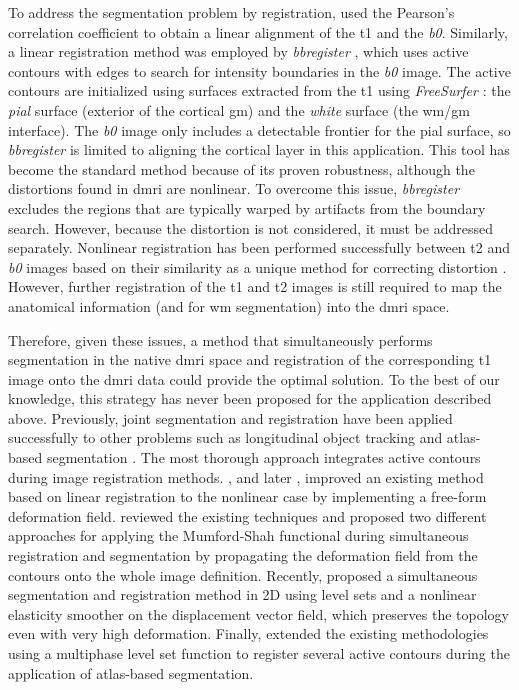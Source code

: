To address the segmentation problem by registration, \cite{saad_new_2009}
  used the Pearson’s correlation coefficient to obtain a linear alignment of the \gls*{t1} and
  the \emph{b0}.
Similarly, a linear registration method was employed by \emph{bbregister} \citep{greve_accurate_2009},
  which uses active contours with edges to search for intensity boundaries in the \emph{b0}
  image.
The active contours are initialized using surfaces extracted from the
  \gls*{t1} using \emph{FreeSurfer} \citep{fischl_freesurfer_2012}:
  the \emph{pial} surface (exterior of the cortical \gls*{gm}) and the \emph{white}
  surface (the \gls*{wm}/\gls*{gm} interface).
The \emph{b0} image only includes a detectable frontier for the pial surface, so
  \emph{bbregister} is limited to aligning the cortical layer in this
  application.
This tool has become the standard method because of its proven robustness, although the
  distortions found in \gls*{dmri} are nonlinear.
To overcome this issue, \emph{bbregister} excludes the
  regions that are typically warped by artifacts from the boundary search.
However, because the distortion is not considered, it must be addressed separately.
Nonlinear registration has been performed successfully between \gls*{t2} and \emph{b0}
  images based on their similarity as a unique method for correcting distortion
  \citep{kybic_unwarping_2000,studholme_accurate_2000,wu_comparison_2008,tao_variational_2009}.
However, further registration of the \gls*{t1} and \gls*{t2} images is still required to map the anatomical
  information (and for \gls*{wm} segmentation) into the \gls*{dmri} space.

Therefore, given these issues, a method that simultaneously performs
  segmentation in the native \gls*{dmri} space and registration of the corresponding \gls*{t1} image
  onto the \gls*{dmri} data could provide the optimal solution.
To the best of our knowledge, this strategy has never been proposed for the application described above.
Previously, joint segmentation and registration have been applied successfully to other problems
such as longitudinal object tracking \citep{paragios_level_2003} and atlas-based
  segmentation \citep{gorthi_active_2011}.
The most thorough approach integrates active contours during image registration
  methods.
\cite{unal_coupled_2005}, and later \cite{wang_joint_2006},
  improved an existing method \citep{yezzi_variational_2003} based on linear registration
  to the nonlinear case by implementing a free-form deformation field.
\cite{droske_mumfordshah_2009} reviewed the existing techniques and proposed two different
  approaches for applying the Mumford-Shah functional \citep{mumford_optimal_1989} during simultaneous
  registration and segmentation by propagating the deformation field from
  the contours onto the whole image definition.
Recently, \cite{guyader_combined_2011} proposed a simultaneous segmentation and
  registration method in 2D using level sets and a nonlinear elasticity smoother on the
  displacement vector field, which preserves the topology even with very high deformation.
Finally, \cite{gorthi_active_2011} extended the existing methodologies using a multiphase
  level set function to register several active contours during the application
  of atlas-based segmentation.

